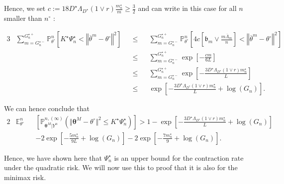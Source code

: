 Hence, we set $c := 18 D^{\star} \Lambda_{D^{\star}} \left(1 \vee r\right) \frac{m_{n}^{\star}}{m} \geq \frac{3}{2}$ and can write in this case for all $n$ smaller than $n^{\circ}$ :

\begin{alignat*}{3}
& \sum\limits_{m = G_{n}^{\star-}}^{G_{n}^{\star+}} \mathds{P}_{\theta^{\circ}}^{n}\left[K^{\star} \Psi_{n}^{\star} < \left\Vert \overline{\theta}^{m} - \theta^{\circ} \right\Vert^{2}\right] && \leq && \sum\limits_{m = G_{n}^{\star-}}^{G_{n}^{\star+}} \mathds{P}_{\theta^{\circ}}^{n}\left[ 4 c \left[\mathfrak{b}_{m} \vee \frac{m \overline{\Lambda}_{m}}{n}\right] < \left\Vert \overline{\theta}^{m} - \theta^{\circ} \right\Vert^{2}\right]\\
& && \leq && \sum\limits_{m = G_{n}^{\star-}}^{G_{n}^{\star+}} \exp\left[-\frac{c m}{6 L}\right]\\
& && \leq && \sum\limits_{m = G_{n}^{\star-}}^{G_{n}^{\star+}} \exp\left[-\frac{3 D^{\star} \Lambda_{D^{\star}} \left(1 \vee r\right) m_{n}^{\star}}{L}\right] \\
& && \leq && \exp\left[-\frac{3 D^{\star} \Lambda_{D^{\star}} \left(1 \vee r \right) m_{n}^{\star}}{L} + \log\left(G_{n}\right)\right].
\end{alignat*}

We can hence conclude that
\begin{alignat*}{2}
& \mathds{E}_{\theta^{\circ}}^{n}&&\left[\mathds{P}_{\boldsymbol{\theta}^{M}\vert Y^{n}}^{n, (\infty)}\left(\Vert \boldsymbol{\theta}^{M} - \theta^{\circ} \Vert ^{2} \leq K^{\star} \Psi_{n}^{\star}\right)\right] > 1 - \exp\left[-\frac{3 D^{\star} \Lambda_{D^{\star}} \left(1 \vee r\right) m_{n}^{\star}}{L} + \log\left(G_{n}\right)\right]\\
& &&- 2 \exp\left[- \frac{5 m_{n}^{\star}}{9 L} + \log\left(G_{n}\right)\right] - 2 \exp\left[- \frac{7 m_{n}^{\star}}{9} + \log\left(G_{n}\right)\right].
\end{alignat*}


Hence, we have shown here that $\Psi_{n}^{\star}$ is an upper bound for the contraction rate under the quadratic risk.
We will now use this to proof that it is also for the minimax risk.

\medskip

